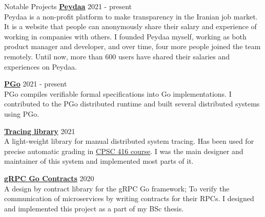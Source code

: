 \documentclass{resume} %
\begin{document}
\begin{rSection}{Notable Projects}
	{\bf \href{https://peydaa.ir/}{Peydaa}} \hfill 2021 - present
	\\ Peydaa is a non-profit platform to make transparency in the Iranian job market. It is a website that people can anonymously share their salary and experience of working in companies with others. I founded Peydaa myself, working as both product manager and developer, and over time, four more people joined the team remotely. Until now, more than 600 users have shared their salaries and experiences on Peydaa.

	{\bf \href{https://github.com/UBC-NSS/pgo}{PGo}} \hfill 2021 - present
	\\PGo compiles verifiable formal specifications into Go implementations. I contributed to the PGo distributed runtime and built several distributed systems using PGo. 

	{\bf \href{https://github.com/DistributedClocks/tracing}{Tracing library}} \hfill 2021
	\\A light-weight library for manual distributed system tracing. Has been used for precise automatic grading in \href{https://www.cs.ubc.ca/~bestchai/teaching/cs416_2020w2/index.html}{CPSC 416 course}. I was the main designer and maintainer of this system and implemented most parts of it.

    {\bf \href{https://github.com/shayanh/grpc-go-contracts}{gRPC Go Contracts}} \hfill 2020
    \\A design by contract library for the gRPC Go framework; To verify the communication of microservices by writing contracts for their RPCs. I designed and implemented this project as a part of my BSc thesis.


\end{rSection}
\end{document}
